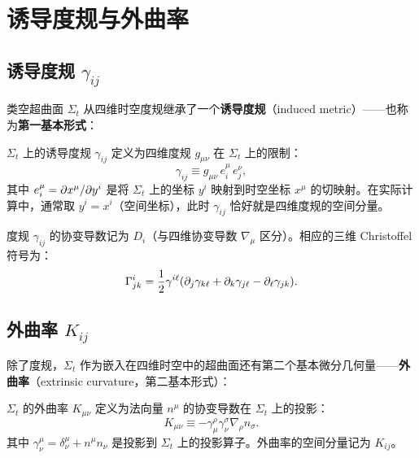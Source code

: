 \section{诱导度规与外曲率}
\label{sec:induced_extrinsic}

\subsection{诱导度规 $\gamma_{ij}$}

类空超曲面 $\Sigma_t$ 从四维时空度规继承了一个\textbf{诱导度规}（induced metric）——也称为\textbf{第一基本形式}：

\begin{definition}
$\Sigma_t$ 上的诱导度规 $\gamma_{ij}$ 定义为四维度规 $g_{\mu\nu}$ 在 $\Sigma_t$ 上的限制：
\begin{equation}
    \boxed{\gamma_{ij} \equiv g_{\mu\nu} \, e^\mu_i \, e^\nu_j},
    \label{eq:gamma_def}
\end{equation}
其中 $e^\mu_i = \partial x^\mu / \partial y^i$ 是将 $\Sigma_t$ 上的坐标 $y^i$ 映射到时空坐标 $x^\mu$ 的切映射。在实际计算中，通常取 $y^i = x^i$（空间坐标），此时 $\gamma_{ij}$ 恰好就是四维度规的空间分量。
\end{definition}

度规 $\gamma_{ij}$ 的协变导数记为 $D_i$（与四维协变导数 $\nabla_\mu$ 区分）。相应的三维 Christoffel 符号为：
\begin{equation}
    \Gamma^i_{jk} = \frac{1}{2}\gamma^{i\ell}(\partial_j\gamma_{k\ell} + \partial_k\gamma_{j\ell} - \partial_\ell\gamma_{jk}).
    \label{eq:Gamma3}
\end{equation}

\subsection{外曲率 $K_{ij}$}

除了度规，$\Sigma_t$ 作为嵌入在四维时空中的超曲面还有第二个基本微分几何量——\textbf{外曲率}（extrinsic curvature，第二基本形式）：

\begin{definition}[外曲率]
$\Sigma_t$ 的外曲率 $K_{\mu\nu}$ 定义为法向量 $n^\mu$ 的协变导数在 $\Sigma_t$ 上的投影：
\begin{equation}
    \boxed{K_{\mu\nu} \equiv -\gamma^\rho_\mu \gamma^\sigma_\nu \nabla_\rho n_\sigma}.
    \label{eq:K_def}
\end{equation}
其中 $\gamma^\mu_\nu = \delta^\mu_\nu + n^\mu n_\nu$ 是投影到 $\Sigma_t$ 上的投影算子。外曲率的空间分量记为 $K_{ij}$。
\label{def:extrinsic_curvature}
\end{definition}

